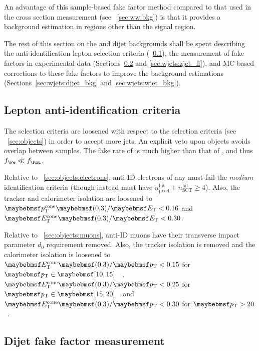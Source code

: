An advantage of this sample-based fake factor method compared to that used in the \WW cross 
section measurement (see \Section~\ref{sec:ww:bkg}) is that it provides a background 
estimation in regions other than the signal region.

The rest of this section on the \Wjets and dijet backgrounds shall be spent describing 
the anti-identification lepton selection criteria (\Section~\ref{sec:wjets:antiid}), the 
measurement of fake factors in experimental data (Sections~\ref{sec:wjets:dijet_ff} and 
\ref{sec:wjets:zjet_ff}), and MC-based corrections to these fake factors to improve the 
background estimations (Sections~\ref{sec:wjets:dijet_bkg} and \ref{sec:wjets:wjet_bkg}).



\subsection{Lepton anti-identification criteria}
\label{sec:wjets:antiid}

The \antiid{\Plepton} selection criteria are loosened with respect to the \id{\Plepton} 
selection criteria (see \Section~\ref{sec:objects}) in order to accept more jets. An 
explicit veto upon \id{\Plepton} objects avoids overlap between samples. The fake rate of 
\antiid{\Pe} is much higher than that of \antiid{\Pmu}, and thus $f_{\Pe} \ll f_{\Pmu}$.

Relative to \Section~\ref{sec:objects:electrons}, anti-ID electrons of any \pt must fail 
the \textit{medium} identification criteria (though instead must have 
$n_{\text{pixel}}^{\text{hit}} + n_{\text{SCT}}^{\text{hit}} \geq 4$). Also, the tracker 
and calorimeter isolation are loosened to $\ptcone{0.3}/\et < 0.16$ and 
$\etcone{0.3}/\et < 0.30$.

Relative to \Section~\ref{sec:objects:muons}, anti-ID muons have their transverse impact 
parameter $d_0$ requirement removed. Also, the tracker isolation is removed and the 
calorimeter isolation is loosened to $\etcone{0.3}/\pt < 0.15$ for 
\unit{$\pt \in \hardrange{10,15}$}{\GeV}, $\etcone{0.3}/\pt < 0.25$ for 
\unit{$\pt \in \hardrange{15,20}$}{\GeV} and $\etcone{0.3}/\pt < 0.30$ for 
\unit{$\pt > 20$}{\GeV}.



\subsection{Dijet fake factor measurement}
\label{sec:wjets:dijet_ff}

